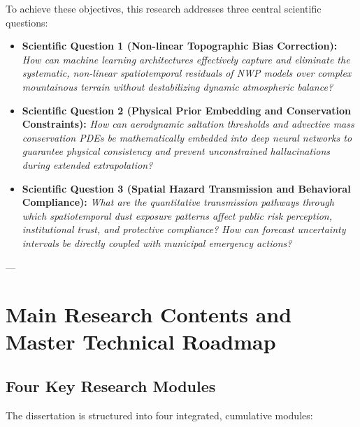 To achieve these objectives, this research addresses three central scientific questions:
\begin{itemize}
    \item \textbf{Scientific Question 1 (Non-linear Topographic Bias Correction):}
    \textit{How can machine learning architectures effectively capture and eliminate the systematic, non-linear spatiotemporal residuals of NWP models over complex mountainous terrain without destabilizing dynamic atmospheric balance?}
    \item \textbf{Scientific Question 2 (Physical Prior Embedding and Conservation Constraints):}
    \textit{How can aerodynamic saltation thresholds and advective mass conservation PDEs be mathematically embedded into deep neural networks to guarantee physical consistency and prevent unconstrained hallucinations during extended extrapolation?}
    \item \textbf{Scientific Question 3 (Spatial Hazard Transmission and Behavioral Compliance):}
    \textit{What are the quantitative transmission pathways through which spatiotemporal dust exposure patterns affect public risk perception, institutional trust, and protective compliance? How can forecast uncertainty intervals be directly coupled with municipal emergency actions?}
\end{itemize}

---

\section{Main Research Contents and Master Technical Roadmap}
\label{sec:contents_roadmap}

\subsection{Four Key Research Modules}
\label{subsec:four_modules}

The dissertation is structured into four integrated, cumulative modules:

